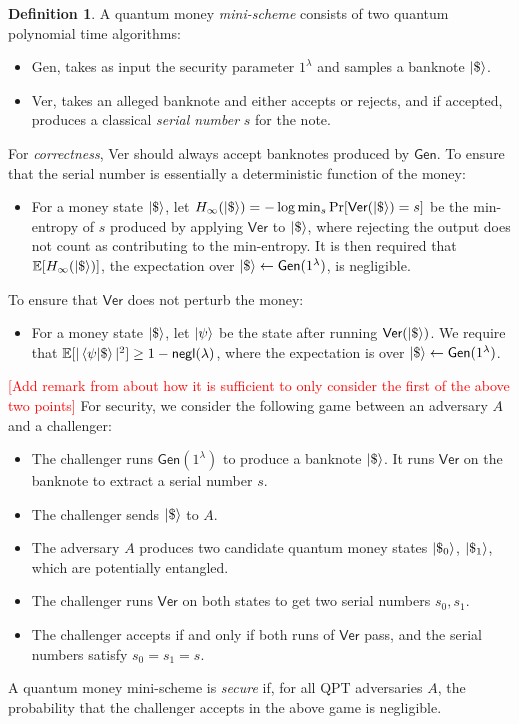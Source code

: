 \documentclass[12pt,letterpaper]{article}
\newcommand{\pynote}[1]{\textcolor{red}{[#1]}}
\theoremstyle{definition}
\newtheorem{defn}[theorem]{Definition}
\theoremstyle{remark}
\begin{document}
\begin{defn}
A quantum money \emph{mini-scheme} consists of two quantum polynomial time algorithms:
\begin{itemize}
    \item \textsf{Gen}, takes as input the security parameter $1^\lambda$ and samples a banknote $\ket{\$}$.
    \item \textsf{Ver}, takes an alleged banknote and either accepts or rejects, and if accepted, produces a classical \emph{serial number} $s$ for the note.
\end{itemize}

For \emph{correctness}, \textsf{Ver} should always accept banknotes produced by $\textsf{Gen}$. To ensure that the serial number is essentially a deterministic function of the money:
\begin{itemize}
    \item For a money state $\ket{\$}$, let $H_{\infty}(\ket{\$})=-\log \text{min}_s \Pr[\textsf{Ver}(\ket{\$})=s]$ be the min-entropy of $s$ produced by applying $\textsf{Ver}$ to $\ket{\$}$, where rejecting the output does not count as contributing to the min-entropy. It is then required that $\mathbb{E}[H_{\infty}(\ket{\$})]$, the expectation over $\ket{\$}\leftarrow \textsf{Gen}(1^\lambda)$, is negligible.
\end{itemize}
To ensure that $\textsf{Ver}$ does not perturb the money:
\begin{itemize}
    \item For a money state $\ket{\$}$, let $\ket{\psi}$ be the state after running $\textsf{Ver}(\ket{\$})$. We require that $\mathbb{E}[|\braket{\psi|\$}|^2]\geq1-\textsf{negl}(\lambda)$, where the expectation is over $\ket{\$}\leftarrow \textsf{Gen}(1^\lambda)$.
\end{itemize}
\pynote{Add remark from \cite{Zha19} about how it is sufficient to only consider the first of the above two points}
For security, we consider the following game between an adversary $A$ and a challenger:
\begin{itemize}
    \item The challenger runs $\textsf{Gen}(1^\lambda)$ to produce a banknote $\ket{\$}$. It runs $\textsf{Ver}$ on the banknote to extract a serial number $s$.
    \item The challenger sends $\ket{\$}$ to $A$.
    \item The adversary $A$ produces two candidate quantum money states $\ket{\$_0}$, $\ket{\$_1}$, which are potentially entangled.
    \item The challenger runs $\textsf{Ver}$ on both states to get two serial numbers $s_0, s_1$.
    \item The challenger accepts if and only if both runs of $\textsf{Ver}$ pass, and the serial numbers satisfy $s_0=s_1=s$.
\end{itemize}
A quantum money mini-scheme is \emph{secure} if, for all QPT adversaries $A$, the probability that the challenger accepts in the above game is negligible.
\end{defn}
\end{document}
